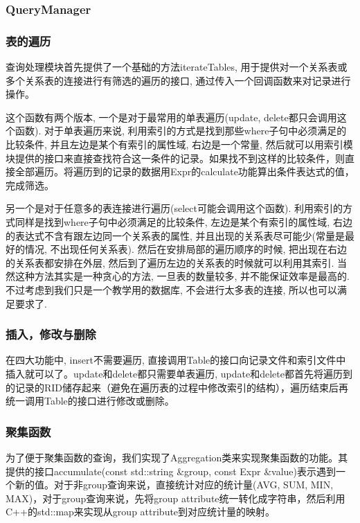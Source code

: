 \documentclass[11pt,UTF8]{report}
\begin{document}
\subsubsection{QueryManager}
\subsubsection{表的遍历}
\label{subsubsec:iterate}
查询处理模块首先提供了一个基础的方法iterateTables, 用于提供对一个关系表或多个关系表的连接进行有筛选的遍历的接口, 通过传入一个回调函数来对记录进行操作。

这个函数有两个版本, 一个是对于最常用的单表遍历(update, delete都只会调用这个函数). 对于单表遍历来说, 利用索引的方式是找到那些where子句中必须满足的比较条件, 并且左边是某个有索引的属性域, 右边是一个常量, 然后就可以用索引模块提供的接口来直接查找符合这一条件的记录。如果找不到这样的比较条件，则直接全部遍历。将遍历到的记录的数据用Expr的calculate功能算出条件表达式的值，完成筛选。

另一个是对于任意多的表连接进行遍历(select可能会调用这个函数). 利用索引的方式同样是找到where子句中必须满足的比较条件, 左边是某个有索引的属性域, 右边的表达式不含有跟左边同一个关系表的属性, 并且出现的关系表尽可能少(常量是最好的情况, 不出现任何关系表). 然后在安排局部的遍历顺序的时候, 把出现在右边的关系表都安排在外层, 然后到了遍历左边的关系表的时候就可以利用其索引. 当然这种方法其实是一种贪心的方法, 一旦表的数量较多, 并不能保证效率是最高的. 不过考虑到我们只是一个教学用的数据库, 不会进行太多表的连接, 所以也可以满足要求了.

\subsubsection{插入，修改与删除}
在四大功能中, insert不需要遍历, 直接调用Table的接口向记录文件和索引文件中插入就可以了。update和delete都只需要单表遍历, update和delete都首先将遍历到的记录的RID储存起来（避免在遍历表的过程中修改索引的结构），遍历结束后再统一调用Table的接口进行修改或删除。

\subsubsection{聚集函数}
为了便于聚集函数的查询，我们实现了Aggregation类来实现聚集函数的功能。其提供的接口accumulate(const std::string \&group, const Expr \&value)表示遇到一个新的值。对于非group查询来说，直接统计对应的统计量(AVG, SUM, MIN, MAX)，对于group查询来说，先将group attribute统一转化成字符串，然后利用C++的std::map来实现从group attribute到对应统计量的映射。
\end{document}
